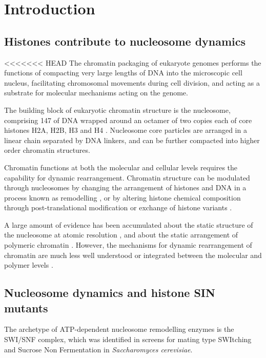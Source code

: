 \section{Introduction}

  \subsection{Histones contribute to nucleosome dynamics}

<<<<<<< HEAD
    The chromatin packaging of eukaryote genomes performs the functions of
    compacting very large lengths of DNA into the microscopic cell nucleus,
    facilitating chromosomal movements during cell division,
    and acting as a substrate for molecular mechanisms acting on the genome.

    The building block of eukaryotic chromatin structure is the nucleosome, 
    comprising \SI{147}{\bp} of DNA wrapped around an octamer of two copies each
    of core histones H2A, H2B, H3 and H4 \citep{luger1997crystal}.
    Nucleosome core particles are arranged in a linear chain separated by DNA linkers,
    and can be further compacted into higher order chromatin structures.

    Chromatin functions at both the molecular and cellular levels 
    requires the capability for dynamic rearrangement.
    Chromatin structure can be modulated through nucleosomes
    by changing the arrangement of histones and DNA in a process known as remodelling ,
    or by altering histone chemical composition 
    through post-translational modification  or exchange of histone variants .

    A large amount of evidence has been accumulated about 
    the static structure of the nucleosome at atomic resolution ,
    and about the static arrangement of polymeric chromatin .
    However, the mechanisms for dynamic rearrangement of chromatin
    are much less well understood or integrated between the molecular and polymer levels .

  \subsection{Nucleosome dynamics and histone SIN mutants}

    The archetype of ATP-dependent nucleosome remodelling enzymes is the SWI/SNF complex,
    which was identified in screens for mating type SWItching \citep{SWI-mutants}
    and Sucrose Non Fermentation \citep{SNF-mutants-original-discovery, SNF-mutants2}
    in \textit{Saccharomyces cerevisiae}.

